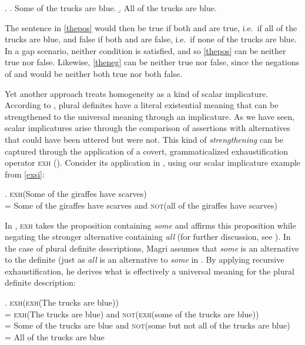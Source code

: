 \documentclass[12pt, letterpaper]{article}
\begin{document}
{\ex. \a. Some of the trucks are blue.
\b. All of the trucks are blue.

The sentence in \ref{thepos} would then be true if both \Last[a] and \Last[b] are true, i.e.~if all of the trucks are blue, and false if both \Last[a] and \Last[b] are false, i.e.~if none of the trucks are blue. In a gap scenario, neither condition is satisfied, and so \ref{thepos} can be neither true nor false. Likewise, \ref{theneg} can be neither true nor false, since the negations of \Last[a] and \Last[b] would be neither both true nor both false.

Yet another approach treats homogeneity as a kind of scalar implicature. According to \cite{Magri:2014}, plural definites have a literal existential meaning that can be strengthened to the universal meaning through an implicature. As we have seen, scalar implicatures arise through the comparison of assertions with alternatives that could have been uttered but were not. This kind of \textit{strengthening} can be captured through the application of a covert, grammaticalized exhaustification operator \textsc{exh} (\citealt*{Fox:2007,Chierchia:2011}). Consider its application in \Next, using our scalar implicature example from \ref{exsi}:

\ex. \textsc{exh}(Some of the giraffes have scarves) \\
= Some of the giraffes have scarves and \textsc{not}(all of the giraffes have scarves) 

In \Last, \textsc{exh} takes the proposition containing \textit{some} and affirms this proposition  while negating the stronger alternative containing \textit{all} (for further discussion, see \citealt{Groenendijk:1984,vanRooijSchulz:2004,Spector:2007,Fox:2007,Chierchia:2011}). In the case of plural definite descriptions, Magri assumes that \textit{some} is an alternative to the definite (just as \textit{all} is an alternative to \textit{some} in \Last. By applying recursive exhaustification, he derives what is effectively a universal meaning for the plural definite description:

\ex. \textsc{exh}(\textsc{exh}(The trucks are blue)) \\
= \textsc{exh}(The trucks are blue) and \textsc{not}(\textsc{exh}(some of the trucks are blue)) \\
= Some of the trucks are blue and \textsc{not}(some but not all of the trucks are blue) \\
= All of the trucks are blue

}
\end{document}

